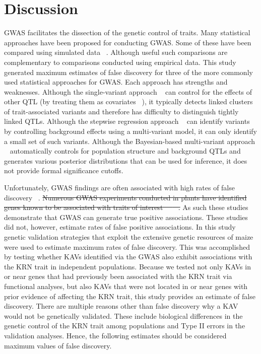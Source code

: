 \documentclass[10pt,letterpaper]{article}
\providecommand{\DIFdeltex}[1]{{\protect\color{red}\sout{#1}}}                      %
\providecommand{\DIFdelbegin}{} %
\providecommand{\DIFdelend}{} %
\providecommand{\DIFdel}[1]{\texorpdfstring{\DIFdeltex{#1}}{}} %
\begin{document}

\section*{Discussion}
GWAS facilitates the dissection of the genetic control of traits. Many statistical approaches have been proposed for conducting GWAS. Some of these have been compared using simulated data ~\cite{Galesloot2014}. Although useful such comparisons are complementary to comparisons conducted using empirical data.  This study generated maximum estimates of false discovery for three of the more commonly used statistical approaches for GWAS. Each approach has strengths and weaknesses. Although the single-variant approach ~\cite{Balding2006} can control for the effects of other QTL (by treating them as covariates ~\cite{Kang2010}), it typically detects linked clusters of trait-associated variants and therefore has difficulty to distinguish tightly linked QTLs. Although the stepwise regression approach ~\cite{Segura2012} can identify variants by controlling background effects using a multi-variant model, it can only identify a small set of such variants. Although the Bayesian-based multi-variant approach ~\cite{Habier2011} automatically controls for population structure and background QTLs and generates various posterior distributions that can be used for inference, it does not provide formal significance cutoffs. 

Unfortunately, GWAS findings are often associated with high rates of false discovery ~\cite{Visscher2012}. \DIFdelbegin \DIFdel{Numerous GWAS experiments conducted in plants have identified genes known to be associated with traits of interest ~\mbox{%
\cite{Larsson2013}
}%
. }\DIFdelend As such these studies demonstrate that GWAS can generate true positive associations. These studies did not, however, estimate rates of false positive associations. In this study genetic validation strategies that exploit the extensive genetic resources of maize were used to estimate maximum rates of false discovery. This was accomplished by testing whether KAVs identified via the GWAS also exhibit associations with the KRN trait in independent populations. Because we tested not only KAVs in or near genes that had previously been associated with the KRN trait via functional analyses, but also KAVs that were not located in or near genes with prior evidence of affecting the KRN trait, this study provides an estimate of false discovery. There are multiple reasons other than false discovery why a KAV would not be genetically validated. These include biological differences in the genetic control of the KRN trait among populations and Type II errors in the validation analyses. Hence, the following estimates should be considered maximum values of false discovery.
\end{document}
